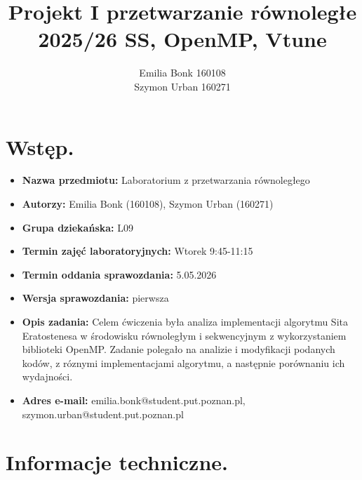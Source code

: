 \documentclass[10pt]{article}
\title{Projekt I przetwarzanie równoległe 2025/26 SS, OpenMP, Vtune}
\author{Emilia Bonk 160108 \\ Szymon Urban 160271}
\date{}
\begin{document}
\maketitle

\section*{Wstęp.}

\begin{itemize}
\item \textbf{Nazwa przedmiotu:} Laboratorium z przetwarzania równoległego
\item \textbf{Autorzy:} Emilia Bonk (160108), Szymon Urban (160271)
\item \textbf{Grupa dziekańska:} L09
\item \textbf{Termin zajęć laboratoryjnych:} Wtorek 9:45-11:15
\item \textbf{Termin oddania sprawozdania:} 5.05.2026
\item \textbf{Wersja sprawozdania:} pierwsza
\item \textbf{Opis zadania:}
Celem ćwiczenia była analiza implementacji algorytmu Sita Eratostenesa 
w środowisku równoległym i sekwencyjnym z wykorzystaniem biblioteki OpenMP. 
Zadanie polegało na analizie i modyfikacji podanych kodów, z róznymi 
implementacjami algorytmu, a następnie porównaniu ich wydajności.
\item \textbf{Adres e-mail:} emilia.bonk@student.put.poznan.pl, szymon.urban@student.put.poznan.pl
\end{itemize}

\section{Informacje techniczne.}
\end{document}
